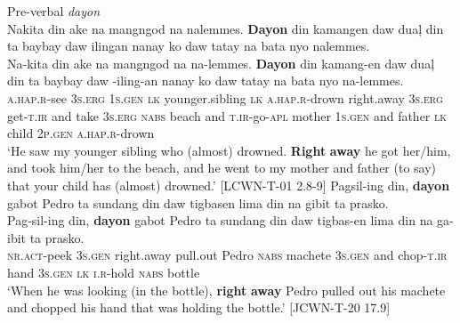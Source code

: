 \ea
\label{bkm:Ref425603569}
Pre-verbal \textit{dayon} \\
Nakita  din  ake  na  mangngod  na  nalemmes. \textbf{Dayon}  din  kamangen  daw  duaļ  din  ta  baybay  daw ilingan  nanay  ko  daw  tatay  na  bata  nyo  nalemmes. \\\smallskip
 \gll Na-kita  din  ake  na  mangngod  na  na-lemmes. \textbf{Dayon}  din  kamang-en  daw  duaļ  din  ta  baybay  daw \emptyset{}-iling-an  nanay  ko  daw  tatay  na  bata  nyo  na-lemmes. \\
\textsc{a.hap.r}-see  3\textsc{s.erg}  1\textsc{s.gen}  \textsc{lk}  younger.sibling  \textsc{lk}  \textsc{a.hap.r}-drown\footnotemark{}
right.away  3\textsc{s.erg}  get-\textsc{t.ir}  and  take  3\textsc{s.erg}  \textsc{nabs}  beach  and \textsc{t.ir}-go-\textsc{apl}  mother  1\textsc{s.gen}  and  father  \textsc{lk}  child  2\textsc{p.gen}  \textsc{a.hap.r}-drown\\
\glt `He saw my younger sibling who (almost) drowned. \textbf{Right} \textbf{away} he got her/him, and took him/her to the beach, and he went to my mother and father (to say) that your child has (almost) drowned.’ [LCWN-T-01 2.8-9]
\z
\largerpage[2]
\ea
Pagsil-ing  din,  \textbf{dayon}  gabot  Pedro  ta  sundang  din daw tigbasen  lima  din  na  gibit  ta  prasko. \\\smallskip
 \gll Pag-sil-ing  din,  \textbf{dayon}  gabot  Pedro  ta  sundang  din daw tigbas-en  lima  din  na  ga-ibit  ta  prasko. \\
\textsc{nr.act}-peek  3\textsc{s.gen}  right.away  pull.out  Pedro  \textsc{nabs}  machete  3\textsc{s.gen} and chop-\textsc{t.ir}  hand  3\textsc{s.gen}  \textsc{lk}  \textsc{i.r}-hold  \textsc{nabs}  bottle \\
\glt `When he was looking (in the bottle), \textbf{right} \textbf{away} Pedro pulled out his machete and chopped his hand that was holding the bottle.’ [JCWN-T-20 17.9]
\z


